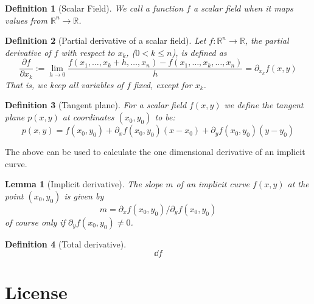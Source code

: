 \documentclass[twocolumn, margin=normal]{tex/hsrzf}
\newcommand\Rset{\mathbb{R}}
\theoremstyle{fuvarzf}
\newtheorem{definition}{Definition}
\newtheorem{lemma}{Lemma}
\begin{document}
\begin{definition}[Scalar Field]
  We call a function \(f\) a \emph{scalar field} when it maps values from
  \(\Rset^n \to \Rset\).
\end{definition}

\begin{definition}[Partial derivative of a scalar field]
  Let \(f: \Rset^n \to \Rset\), the \emph{partial} derivative of \(f\) with
  respect to \(x_k\), (\(0 < k \leq n\)), is defined as
  \[
    \frac{\partial f}{\partial x_k} :=
    \lim_{h \to 0} \frac{f(x_1, \dots, x_k + h, \dots, x_n) 
      - f(x_1, \dots, x_k, \dots, x_n)}{h}
    = \partial_{x_k} f(x, y)
  \]
  That is, we keep all variables of \(f\) fixed, except for \(x_k\).
\end{definition}

\begin{definition}[Tangent plane]
  For a scalar field \(f(x,y)\) we define the \emph{tangent plane} \(p(x,y)\)
  at coordinates \((x_0, y_0)\) to be:
  \[
    p(x, y) =
      f(x_0, y_0)
      + \partial_x f(x_0, y_0) (x - x_0)
      + \partial_y f(x_0, y_0) (y - y_0)
  \]
\end{definition}

The above can be used to calculate the one dimensional derivative of an implicit curve.

\begin{lemma}[Implicit derivative]
  The slope \(m\) of an implicit curve \(f(x,y)\) at the point \((x_0, y_0)\) is given by
  \[
    m = \partial_x f(x_0, y_0) / \partial_y f(x_0, y_0)
  \]
  of course only if \(\partial_y f(x_0, y_0) \neq 0\).
\end{lemma}

\begin{definition}[Total derivative]
  \[
    \dd{f}
  \]
\end{definition}


\section*{License}
\doclicenseText

\begin{center}
  \doclicenseImage
\end{center}
\end{document}

